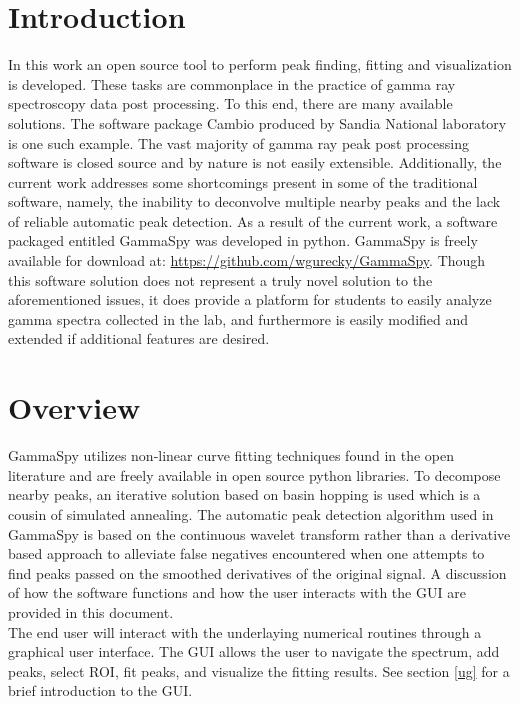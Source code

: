 \documentclass[10pt]{article}
\begin{document}
\section{Introduction}
In this work an open source tool to perform peak finding, fitting and visualization is developed.  These tasks
are commonplace in the practice of gamma ray spectroscopy data post processing.
To this end, there are many available solutions.  The software
package Cambio produced by Sandia National laboratory is one such example.  The vast majority
of gamma ray peak post processing software is closed source and by nature is not easily extensible.
Additionally, the current work addresses some shortcomings present in some of the traditional
software, namely, the inability to deconvolve multiple nearby peaks and the lack of reliable automatic
peak detection.  As a result of the current work, a software packaged entitled GammaSpy was developed in python.
GammaSpy is freely available for download at: \url{https://github.com/wgurecky/GammaSpy}.  Though
this software solution does not represent a truly novel solution to the aforementioned issues, it does
provide a platform for students to easily analyze gamma spectra collected in the lab, and furthermore
is easily modified and extended if additional features are desired.

\section{Overview}

GammaSpy utilizes non-linear curve fitting techniques found in the open
literature and are freely available in open source python libraries.  To
decompose nearby peaks, an iterative solution based on basin hopping is used
which is a cousin of simulated annealing.  The automatic peak detection
algorithm used in GammaSpy is based on the continuous wavelet transform rather
than a derivative based approach to alleviate false negatives encountered when
one attempts to find peaks passed on the smoothed derivatives of the original
signal.  A discussion of how the software functions and how the user interacts
with the GUI are provided in this document. \\

The end user will interact with the underlaying numerical routines through a
graphical user interface. The GUI allows the user to navigate the spectrum, add
peaks, select ROI, fit peaks, and visualize the fitting results.
See section \ref{ug} for a brief introduction to the GUI.
\end{document}
